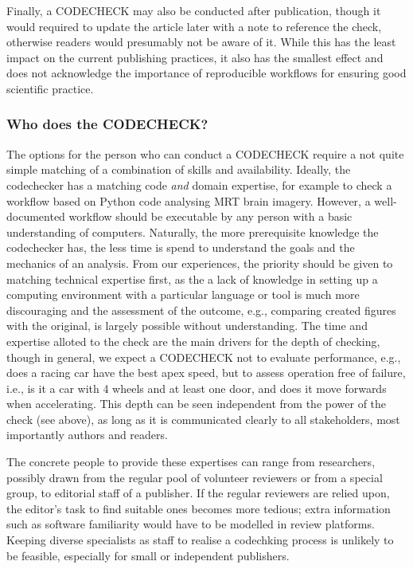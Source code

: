 \documentclass[12pt]{article}
\begin{document}
Finally, a CODECHECK may also be conducted after publication, though it
would required to update the article later with a note to reference the check,
otherwise readers would presumably not be aware of it. While this has the
least impact on the current publishing practices, it also has the smallest
effect and does not acknowledge the importance of reproducible workflows for
ensuring good scientific practice.

\subsubsection*{Who does the CODECHECK?}\label{who-does-the-codecheck}

The options for the person who can conduct a CODECHECK require a not quite
simple matching of a combination of skills and availability. Ideally, the
codechecker has a matching code \emph{and} domain expertise, for example to
check a workflow based on Python code analysing MRT brain imagery. However,
a well-documented workflow should be executable by any person with a basic
understanding of computers. Naturally, the more prerequisite knowledge the
codechecker has, the less time is spend to understand the goals and 
the mechanics of an analysis. From our experiences, the priority should be
given to matching technical expertise first, as the a lack of knowledge in
setting  up a computing environment with a particular language or tool is 
much more discouraging and the assessment of the outcome, e.g., comparing
created figures with the original, is largely possible without 
understanding.
The time and expertise alloted to the check
are the main drivers for the depth of checking, though in general, we 
expect a CODECHECK not to evaluate performance, e.g., does a racing car
have the best apex speed, but to assess operation free of failure, i.e., 
is it a car with 4 wheels and at least one door, and does it move forwards
when accelerating. This depth can be seen independent from the power of
the check (see above), as long as it is communicated clearly to all
stakeholders, most importantly authors and readers.

The concrete people to provide these expertises can range from researchers,
possibly drawn from the regular pool of volunteer reviewers or from a 
special group, to editorial staff of a publisher. If the regular reviewers
are relied upon, the editor's task to find suitable ones becomes more
tedious; extra information such as software familiarity would have to be
modelled in review platforms. Keeping diverse specialists as staff to
realise a codechking process is unlikely to be feasible, especially for 
small or independent publishers.
\end{document}
